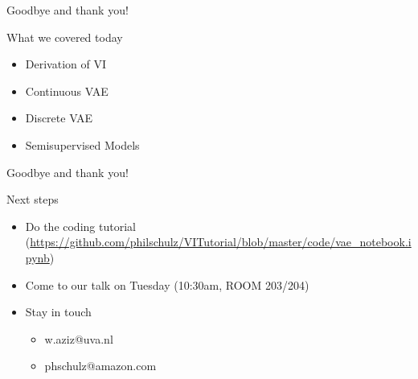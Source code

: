 \documentclass[14pt]{beamer}
\begin{document}
\begin{frame}{Goodbye and thank you!}
\begin{block}{What we covered today}
\begin{itemize}
\item Derivation of VI
\item Continuous VAE
\item Discrete VAE
\item Semisupervised Models
\end{itemize}
\end{block}
\end{frame}

\begin{frame}{Goodbye and thank you!}
\begin{block}{Next steps}
\begin{itemize}
\item Do the coding tutorial (\href{https://github.com/philschulz/VITutorial/blob/master/code/vae_notebook.ipynb}{\url{https://github.com/philschulz/VITutorial/blob/master/code/vae_notebook.ipynb}})
\item Come to our talk on Tuesday (10:30am, ROOM 203/204)
\item Stay in touch
\begin{itemize}
\item w.aziz@uva.nl
\item phschulz@amazon.com
\end{itemize}
\end{itemize}
\end{block}
\end{frame}
\end{document}
